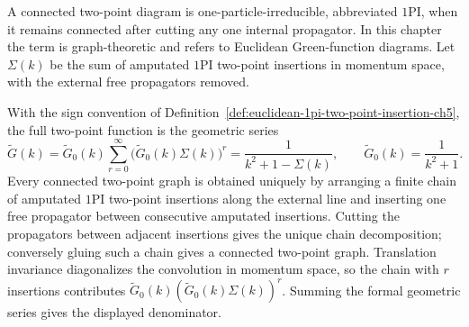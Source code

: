 \begin{definition}
\label{def:euclidean-1pi-two-point-insertion-ch5}
A connected two-point diagram is one-particle-irreducible, abbreviated
\(1\mathrm{PI}\), when it remains connected after cutting any one internal
propagator. In this chapter the term is graph-theoretic and refers to
Euclidean Green-function diagrams.  Let \(\Sigma(k)\) be the sum of amputated
\(1\mathrm{PI}\) two-point insertions in momentum space, with the external
free propagators removed.
\end{definition}

With the sign convention of
Definition~\ref{def:euclidean-1pi-two-point-insertion-ch5}, the full
two-point function is the geometric series
\[
  \widetilde G(k)
  =
  \widetilde G_0(k)
  \sum_{r=0}^{\infty}
  \bigl(\widetilde G_0(k)\Sigma(k)\bigr)^r
  =
  \frac{1}{k^2+1-\Sigma(k)},
  \qquad
  \widetilde G_0(k)=\frac{1}{k^2+1}.
\]
Every connected two-point graph is obtained uniquely by arranging a finite
chain of amputated \(1\mathrm{PI}\) two-point insertions along the external
line and inserting one free propagator between consecutive amputated
insertions.  Cutting the propagators between adjacent insertions gives the
unique chain decomposition; conversely gluing such a chain gives a connected
two-point graph.  Translation invariance diagonalizes the convolution in
momentum space, so the chain with \(r\) insertions contributes
\(\widetilde G_0(k)(\widetilde G_0(k)\Sigma(k))^r\).  Summing the formal
geometric series gives the displayed denominator.

\begin{center}
\end{center}

